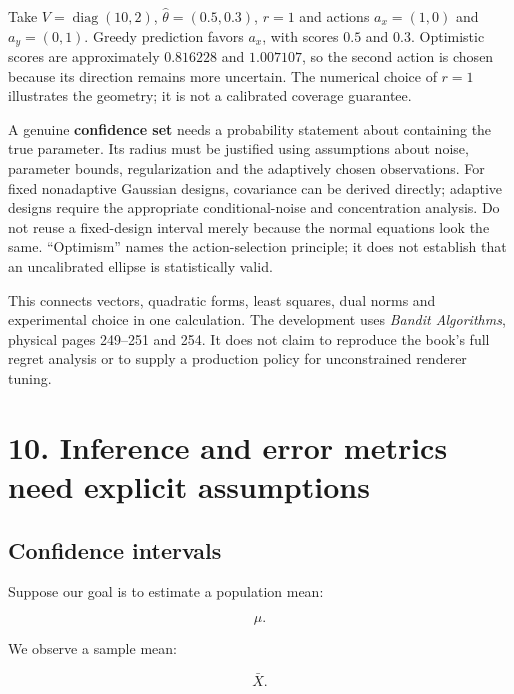 Take \(V=\operatorname{diag}(10,2)\), \(\widehat\theta=(0.5,0.3)\), \(r=1\) and actions \(a_x=(1,0)\) and \(a_y=(0,1)\). Greedy prediction favors \(a_x\), with scores \(0.5\) and \(0.3\). Optimistic scores are approximately \(0.816228\) and \(1.007107\), so the second action is chosen because its direction remains more uncertain. The numerical choice of \(r=1\) illustrates the geometry; it is not a calibrated coverage guarantee.

A genuine \textbf{confidence set} needs a probability statement about containing the true parameter. Its radius must be justified using assumptions about noise, parameter bounds, regularization and the adaptively chosen observations. For fixed nonadaptive Gaussian designs, covariance can be derived directly; adaptive designs require the appropriate conditional-noise and concentration analysis. Do not reuse a fixed-design interval merely because the normal equations look the same. ``Optimism'' names the action-selection principle; it does not establish that an uncalibrated ellipse is statistically valid.

This connects vectors, quadratic forms, least squares, dual norms and experimental choice in one calculation. The development uses \emph{Bandit Algorithms}, physical pages 249--251 and 254. It does not claim to reproduce the book's full regret analysis or to supply a production policy for unconstrained renderer tuning.

\section{10. Inference and error metrics need explicit assumptions}\label{02-foundations-ii-ch030-inference-and-error-metrics-need-explicit-assumptions}

\hypertarget{02-foundations-ii-ch030-inference-and-error-metrics-need-explicit-assumptions}{}

\subsection{Confidence intervals}\label{02-foundations-ii-ch030-confidence-intervals}

\hypertarget{02-foundations-ii-ch030-confidence-intervals}{}

Suppose our goal is to estimate a population mean:

\[
 \mu.
\]

We observe a sample mean:

\[
 \bar X.
\]

